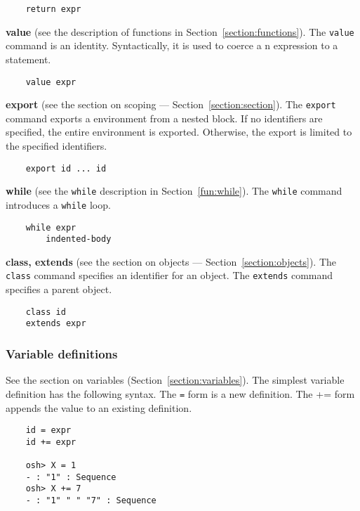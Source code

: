 \begin{verbatim}
    return expr
\end{verbatim}

\textbf{value} (see the description of functions in Section~\ref{section:functions}).  The \verb+value+ command is an identity.
Syntactically, it is used to coerce a n expression to a statement.

\begin{verbatim}
    value expr
\end{verbatim}

\textbf{export} (see the section on scoping --- Section~\ref{section:section}).  The \verb+export+ command exports
a environment from a nested block.  If no identifiers are specified, the entire environment is exported.
Otherwise, the export is limited to the specified identifiers.

\begin{verbatim}
    export id ... id
\end{verbatim}

\textbf{while} (see the \verb+while+ description in Section~\ref{fun:while}).  The \verb+while+ command introduces a \verb+while+ loop.

\begin{verbatim}
    while expr
        indented-body
\end{verbatim}

\textbf{class, extends} (see the section on objects --- Section~\ref{section:objects}).  The \verb+class+ command
specifies an identifier for an object.  The \verb+extends+ command specifies a parent object.

\begin{verbatim}
    class id
    extends expr
\end{verbatim}

\subsubsection{Variable definitions}

See the section on variables (Section~\ref{section:variables}).  The simplest variable definition has the
following syntax.  The \verb+=+ form is a new definition.  The += form appends the value to
an existing definition.

\begin{verbatim}
    id = expr
    id += expr

    osh> X = 1
    - : "1" : Sequence
    osh> X += 7
    - : "1" " " "7" : Sequence
\end{verbatim}

